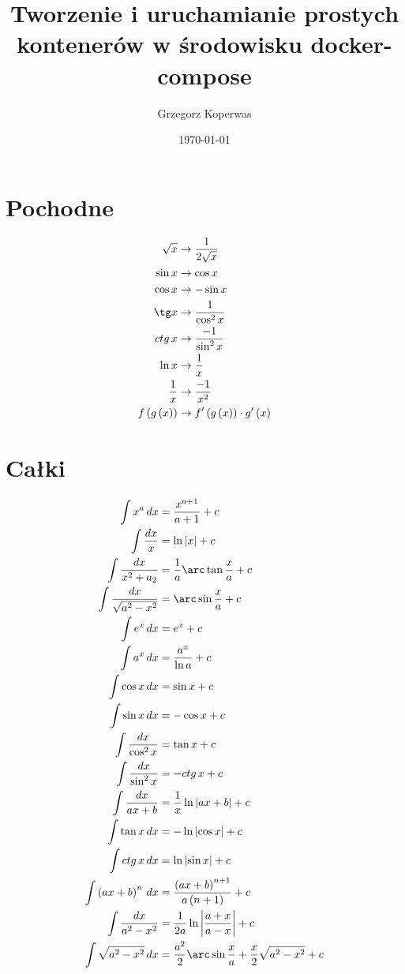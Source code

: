 \documentclass[a4paper,12pt]{article}
\title{Tworzenie i uruchamianie prostych kontenerów w środowisku  docker-compose}
\author{Grzegorz Koperwas}
\date{\today}
\begin{document}
\begin{multicols}{2}
    \section{Pochodne}
    \begin{align*}
        \sqrt{x} &\rightarrow \frac{1}{2 \sqrt{x}}\\
        \sin x &\rightarrow \cos x\\
        \cos x &\rightarrow - \sin x\\
        \tg x &\rightarrow \frac{1}{\cos^2 x}\\
        ctg\, x &\rightarrow \frac{ -1}{\sin^2 x}\\
        \ln x &\rightarrow \frac{1}{x}\\
        \frac{1}{x} &\rightarrow \frac{ - 1}{x^2}\\
        f \left(g \left(x\right)\right) &\rightarrow f'\left(g\left(x\right)\right) \cdot g'\left(x\right)
    \end{align*}
    \section{Całki}

    \begingroup
    \allowdisplaybreaks
    \begin{align*}
        \int x^a\, dx &= \frac{x^{a + 1}}{a + 1} + c \\
        \int \frac{dx}{x} &= \ln \left| x \right| + c \\
        \int \frac{dx}{x^2 + a_2} &= \frac{1}{a} \arc\tan \frac{x}{a} + c \\
        \int \frac{dx}{\sqrt{a^2 - x^2}} &= \arc\sin \frac{x}{a} + c \\
        \int e^x\, dx &= e^x + c \\
        \int a^x\, dx &= \frac{a^x}{\ln a} + c \\ 
        \int \cos x\, dx &= \sin x + c \\
        \int \sin x\, dx &= - \cos x + c \\
        \int \frac{dx}{\cos^{2} x} &= \tan x + c \\
        \int \frac{dx}{\sin^{2} x} &= - ctg\,  x + c \\
        \int \frac{dx}{ax + b} &= \frac{1}{x} \ln \left| ax + b \right| + c \\
        \int \tan x\, dx &= -\ln \left| \cos x \right| + c \\
        \int ctg\,  x\, dx &= \ln \left| \sin x \right| + c \\
        \int \left(ax + b\right)^n\, dx &= \frac{\left(ax + b\right)^{n + 1}}{a\left(n + 1\right)} + c \\
        \int \frac{dx}{a^2 - x^2} &= \frac{1}{2a} \ln \left| \frac{a + x}{a - x} \right| + c \\
        \int \sqrt{a^2 - x^2}\, dx &= \frac{a^2}{2} \arc\sin \frac{x}{a} + \frac{x}{2}\sqrt{a^2 - x^2} + c
    \end{align*}
    \endgroup

\end{multicols}
\end{document}
